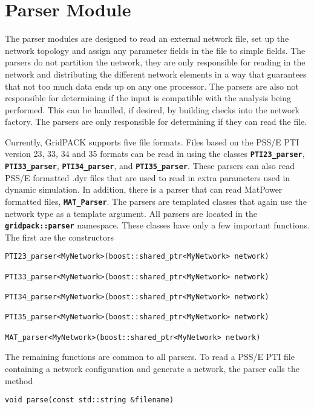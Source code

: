 \section{Parser Module}\label{parsers}

The parser modules are designed to read an external network file, set up the network topology and assign any parameter fields in the file to simple fields. The parsers do not partition the network, they are only responsible for reading in the network and distributing the different network elements in a way that guarantees that not too much data ends up on any one processor. The parsers are also not responsible for determining if the input is compatible with the analysis being performed. This can be handled, if desired, by building checks into the network factory. The parsers are only responsible for determining if they can read the file.

Currently, GridPACK supports five file formats. Files based on the PSS/E PTI
version 23, 33, 34 and 35 formats can be read in using the classes
\texttt{\textbf{PTI23\_parser}}, \texttt{\textbf{PTI33\_parser}},
\texttt{\textbf{PTI34\_parser}}, and \texttt{\textbf{PTI35\_parser}}. These
parsers can also read PSS/E formatted .dyr files that are used to read in extra
parameters used in dynamic simulation. In addition, there is a parser that can
read MatPower formatted files, \texttt{\textbf{MAT\_Parser}}. The parsers are
templated classes that again use the network type as a template argument. All
parsers are located in the \texttt{\textbf{gridpack::parser}} namespace. These classes have only a few important functions. The first are the constructors

{
\color{red}
\begin{Verbatim}[fontseries=b]
PTI23_parser<MyNetwork>(boost::shared_ptr<MyNetwork> network)

PTI33_parser<MyNetwork>(boost::shared_ptr<MyNetwork> network)

PTI34_parser<MyNetwork>(boost::shared_ptr<MyNetwork> network)

PTI35_parser<MyNetwork>(boost::shared_ptr<MyNetwork> network)

MAT_parser<MyNetwork>(boost::shared_ptr<MyNetwork> network)
\end{Verbatim}
}

The remaining functions are common to all parsers. To read a PSS/E PTI file containing a network configuration and generate a network, the parser calls the method

{
\color{red}
\begin{Verbatim}[fontseries=b]
void parse(const std::string &filename)
\end{Verbatim}
}

